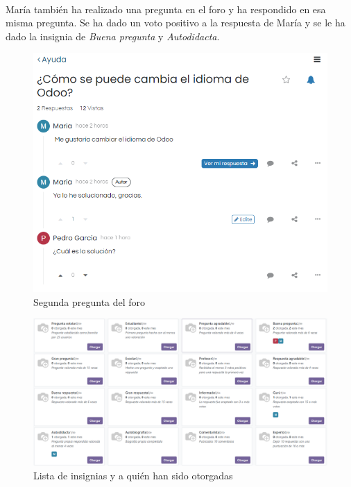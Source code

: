 \paragraph{}
María también ha realizado una pregunta en el foro y ha respondido en esa misma pregunta. Se ha dado un voto positivo a la respuesta de María y se le ha dado la insignia de \textit{Buena pregunta} y \textit{Autodidacta}. 
\newpage
\begin{figure}[h]
    \centering
    \includegraphics[width=0.75\linewidth]{fotosGestCon/pregunta2.png}
    \caption{Segunda pregunta del foro}
    \label{fig:enter-label}
\end{figure}
\begin{figure}[h]
    \centering
    \includegraphics[width=1\linewidth]{fotosGestCon/insignias.png}
    \caption{Lista de insignias y a quién han sido otorgadas}
    \label{fig:enter-label}
\end{figure}
